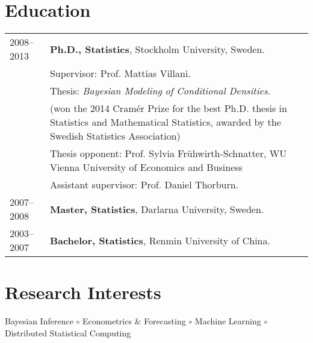 \documentclass[twoside,a4paper]{article}
\begin{document}
\section{Education}

\begin{tabular}{ l  p{} l}
  2008--2013 & \textbf{Ph.D., Statistics}, Stockholm University, Sweden. \\
             & Supervisor: Prof. Mattias Villani.                        \\

             & Thesis: \emph{Bayesian Modeling of Conditional Densities}. \\
             & (won the 2014 Cramér Prize for the best Ph.D. thesis in Statistics and Mathematical Statistics, awarded by the Swedish Statistics Association) \\
             & Thesis opponent: Prof. Sylvia Frühwirth-Schnatter, WU Vienna University of Economics and Business               \\
             & Assistant supervisor: Prof. Daniel Thorburn.                     \\
  2007--2008 & \textbf{Master, Statistics}, Darlarna
               University, Sweden.                                             \\

 2003--2007 & \textbf{Bachelor, Statistics}, Renmin University of China. \\
\end{tabular}

\section{Research Interests}

Bayesian Inference $\circ$ Econometrics \& Forecasting $\circ$ Machine Learning $\circ$ Distributed Statistical Computing
\end{document}
